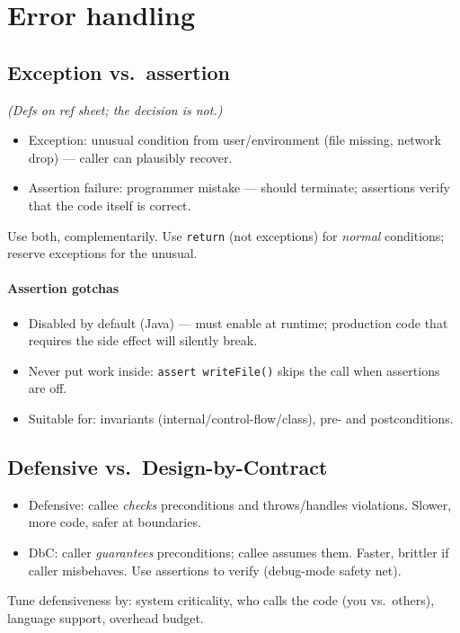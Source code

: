 \section{Error handling}

\subsection{Exception vs.\ assertion}
\textit{(Defs on ref sheet; the \emph{decision} is not.)}
\begin{itemize}
  \item \textcolor{Bittersweet}{Exception}: unusual condition from user/environment (file missing, network drop) — caller can plausibly recover.
  \item \textcolor{Bittersweet}{Assertion failure}: programmer mistake — should terminate; assertions verify that the code itself is correct.
\end{itemize}
\textcolor{Bittersweet}{Use both, complementarily.} Use \texttt{return} (not exceptions) for \emph{normal} conditions; reserve exceptions for the unusual.

\paragraph{Assertion gotchas}
\begin{itemize}
  \item \textcolor{Bittersweet}{Disabled by default} (Java) — must enable at runtime; production code that requires the side effect will silently break.
  \item \textcolor{Bittersweet}{Never put work inside}: \texttt{assert writeFile()} skips the call when assertions are off.
  \item Suitable for: invariants (internal/control-flow/class), pre- and postconditions.
\end{itemize}

\subsection{Defensive vs.\ Design-by-Contract}
\begin{itemize}
  \item \textcolor{Bittersweet}{Defensive}: callee \emph{checks} preconditions and throws/handles violations. Slower, more code, safer at boundaries.
  \item \textcolor{Bittersweet}{DbC}: caller \emph{guarantees} preconditions; callee assumes them. Faster, brittler if caller misbehaves. Use assertions to verify (debug-mode safety net).
\end{itemize}
\textcolor{Bittersweet}{Tune defensiveness} by: system criticality, who calls the code (you vs.\ others), language support, overhead budget.

